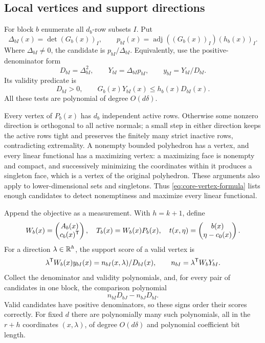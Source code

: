 \subsection{Local vertices and support directions}\label{app:local-support}

For block $b$ enumerate all $d_b$-row subsets $I$. Put
\[
 \Delta_{bI}(x)=\det (G_b(x))_I,\qquad
 p_{bI}(x)=\operatorname{adj}((G_b(x))_I)(h_b(x))_I.
\]
Where $\Delta_{bI}\ne0$, the candidate is
$p_{bI}/\Delta_{bI}$. Equivalently, use the positive-denominator form
\begin{equation}\label{eq:core-vertex-formula}
 D_{bI}=\Delta_{bI}^2,\qquad Y_{bI}=\Delta_{bI}p_{bI},\qquad
                          y_{bI}=Y_{bI}/D_{bI}.
\end{equation}
Its validity predicate is
\begin{equation}\label{eq:core-vertex-validity}
 D_{bI}>0,\qquad G_b(x)Y_{bI}(x)\le h_b(x)D_{bI}(x).
\end{equation}
All these tests are polynomial of degree $O(d\delta)$.

Every vertex of $P_b(x)$ has $d_b$ independent active rows. Otherwise
some nonzero direction is orthogonal to all active normals; a small
step in either direction keeps the active rows tight and preserves the
finitely many strict inactive rows, contradicting extremality. A
nonempty bounded polyhedron has a vertex, and every linear functional
has a maximizing vertex: a maximizing face is nonempty and compact, and
successively minimizing the coordinates within it produces a singleton
face, which is a vertex of the original polyhedron. These arguments also
apply to lower-dimensional sets and singletons. Thus
\eqref{eq:core-vertex-formula} lists enough candidates to detect
nonemptiness and maximize every linear functional.

Append the objective as a measurement. With $h=k+1$, define
\begin{equation}\label{eq:core-images}
 W_b(x)=\begin{pmatrix}A_b(x)\\c_b(x)^{\mathsf T}\end{pmatrix},\quad
 T_b(x)=W_b(x)P_b(x),\quad
 t(x,\eta)=\begin{pmatrix}b(x)\\\eta-c_0(x)\end{pmatrix}.
\end{equation}
For a direction $\lambda\in\mathbb R^h$, the support score of a valid
vertex is
\[
 \lambda^{\mathsf T} W_b(x)y_{bI}(x)=n_{bI}(x,\lambda)/D_{bI}(x),\qquad
 n_{bI}=\lambda^{\mathsf T} W_bY_{bI}.
\]
Collect the denominator and validity polynomials, and, for every pair
of candidates in one block, the comparison polynomial
\begin{equation}\label{eq:core-score-comparison}
                     n_{bI}D_{bJ}-n_{bJ}D_{bI}.
\end{equation}
Valid candidates have positive denominators, so these signs order their
scores correctly. For fixed $d$ there are polynomially many such
polynomials, all in the $r+h$ coordinates $(x,\lambda)$, of degree
$O(d\delta)$ and polynomial coefficient bit length.

